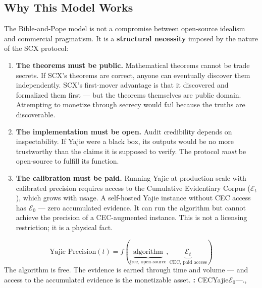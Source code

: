 \documentclass[12pt,a4paper]{article}
\theoremstyle{remark}
\begin{document}
\subsection{Why This Model Works}
The Bible-and-Pope model is not a compromise between open-source idealism 
and commercial pragmatism. It is a \textbf{structural necessity} imposed by 
the nature of the SCX protocol:
\begin{enumerate}[label=(\arabic*), leftmargin=*]
 \item \textbf{The theorems must be public.} Mathematical theorems cannot be 
 trade secrets. If SCX's theorems are correct, anyone can eventually 
 discover them independently. SCX's first-mover advantage is that it 
 discovered and formalized them first --- but the theorems themselves are 
 public domain. Attempting to monetize through secrecy would fail 
 because the truths are discoverable.
 \item \textbf{The implementation must be open.} Audit credibility depends 
 on inspectability. If Yajie were a black box, its outputs would be 
 no more trustworthy than the claims it is supposed to verify. The 
 protocol \textit{must} be open-source to fulfill its function.
 \item \textbf{The calibration must be paid.} Running Yajie at production 
 scale with calibrated precision requires access to the Cumulative 
 Evidentiary Corpus ($\mathcal{E}_t$), which grows with usage. 
 A self-hosted Yajie instance without CEC access has $\mathcal{E}_0$ --- 
 zero accumulated evidence. It can run the algorithm but cannot achieve 
 the precision of a CEC-augmented instance. This is not a licensing 
 restriction; it is a physical fact.
\end{enumerate}
\begin{equation}
\text{Yajie Precision}(t) = f(\underbrace{\text{algorithm}}_{\text{free, open-source}}, 
 \underbrace{\mathcal{E}_t}_{\text{CEC, paid access}})
\end{equation}
The algorithm is free. The evidence is earned through time and volume --- and 
access to the accumulated evidence is the monetizable asset.
\noindent\textbf{: }
CECYajie$\mathcal{E}_0$---., 
\end{document}
